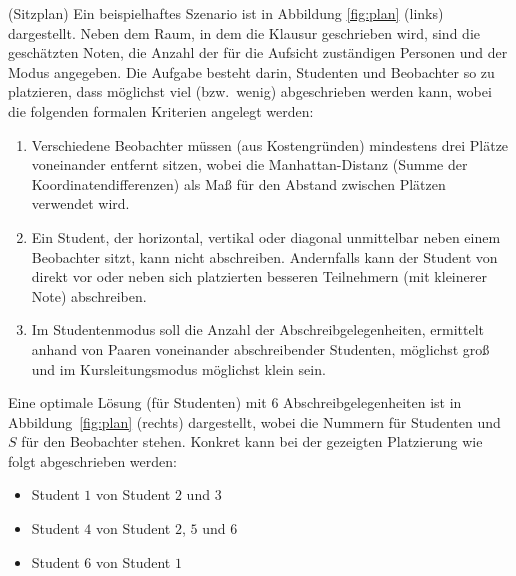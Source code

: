 \documentclass[a4paper,12pt,ngerman]{article}
\begin{document}
\begin{PraktikumsAufgabe}{2}{(Sitzplan)}
\noindent
Ein beispielhaftes Szenario ist in Abbildung \ref{fig:plan} (links) dargestellt.
Neben dem Raum, in dem die Klausur geschrieben wird, sind die geschätzten Noten,
die Anzahl der für die Aufsicht zuständigen Personen und der Modus angegeben.
Die Aufgabe besteht darin, Studenten und Beobachter so zu platzieren,
dass möglichst viel (bzw.\ wenig) abgeschrieben werden kann,
wobei die folgenden formalen Kriterien angelegt werden:
\vspace{-3mm}
\begin{enumerate}\itemsep-3pt
  \item Verschiedene Beobachter müssen (aus Kostengründen)
        mindestens drei Plätze voneinander entfernt sitzen,
        wobei die Manhattan-Distanz (Summe der Koordinatendifferenzen)
        als Maß für den Abstand zwischen Plätzen
        verwendet wird. %
  \item Ein Student, der horizontal, vertikal oder diagonal unmittelbar neben
        einem Beobachter sitzt,
        kann nicht abschreiben. %
        Andernfalls kann der Student von direkt vor oder neben sich platzierten
        besseren Teilnehmern (mit kleinerer Note) abschreiben.
  \item Im Studentenmodus soll die Anzahl der Abschreibgelegenheiten,
        ermittelt anhand von Paaren voneinander abschreibender Studenten,
        möglichst groß und im Kursleitungsmodus möglichst klein sein.
\end{enumerate}
\vspace{-3mm}
Eine optimale L\"osung (für Studenten) mit 6 Abschreibgelegenheiten ist in Abbildung~\ref{fig:plan} (rechts) dargestellt, wobei die Nummern für Studenten und $S$ für den Beobachter stehen.
Konkret kann bei der gezeigten Platzierung wie folgt abgeschrieben werden:
\vspace{-3mm}
\begin{itemize}\itemsep-3pt
\item Student $1$ von Student $2$ und $3$
\item Student $4$ von Student $2$, $5$ und $6$
\item Student $6$ von Student $1$
\end{itemize}


\end{PraktikumsAufgabe}
\end{document}
